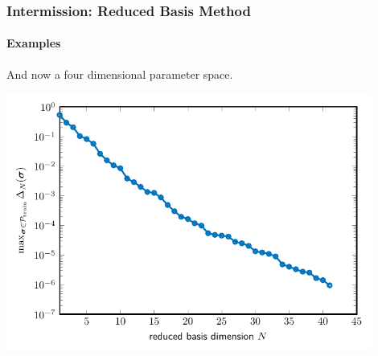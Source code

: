 \begin{frame}[t]
    \frametitle{Intermission: Reduced Basis Method}
    \framesubtitle{Examples}

    And now a four dimensional parameter space.

    \centering
    \includegraphics[width=0.9\textwidth]{figures/ch5ex2_rbm_error.pdf}
\end{frame}


